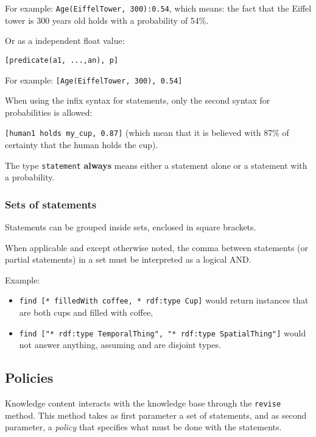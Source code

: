 For example: {\tt Age(EiffelTower, 300):0.54}, which means: the fact that the
Eiffel tower is 300 years old holds with a probability of 54\%.

Or as a independent float value:

\begin{center} \tt [predicate(a1, ...,an), p] \end{center}

For example: \texttt{[Age(EiffelTower, 300), 0.54]}

When using the infix syntax for statements, only the second syntax for
probabilities is allowed:

\texttt{[human1 holds my\_cup, 0.87]} (which mean that it is believed with 87\%
of certainty that the human holds the cup).

The type \texttt{statement} \textbf{always} means either a statement alone or a
statement with a probability.


\subsubsection{Sets of statements}

Statements can be grouped inside sets, enclosed in square brackets.

When applicable and except otherwise noted, the comma between statements (or
partial statements) in a set must be interpreted as a logical AND.

Example:

\begin{itemize}
    \item {\tt find [* filledWith coffee, * rdf:type Cup]} would return
    instances that are both cups and filled with coffee,

    \item {\tt find ["* rdf:type TemporalThing", "* rdf:type SpatialThing"]}
    would not answer anything, assuming  and
     are disjoint types.

\end{itemize}

\subsection{Policies}
\label{sect|kbapi-policies}

Knowledge content interacts with the knowledge base through the \texttt{revise}
method. This method takes as first parameter a set of statements, and as second
parameter, a \emph{policy} that specifies what must be done with the
statements.

